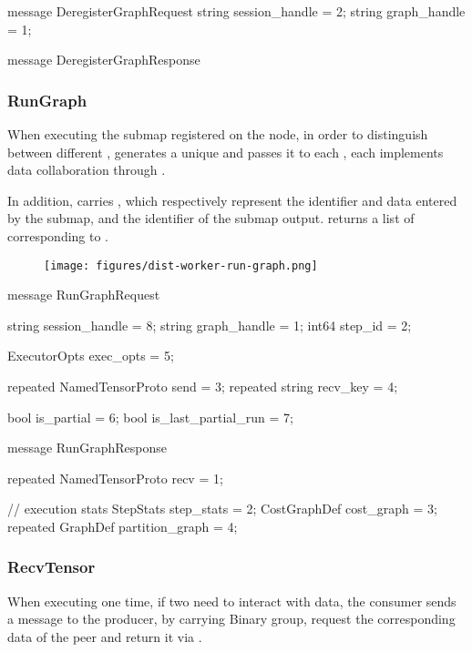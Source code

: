 \begin{content}
\begin{leftbar}
\begin{c++}
message DeregisterGraphRequest {
  string session_handle = 2;
  string graph_handle = 1;
}

message DeregisterGraphResponse {
}
\end{c++}
\end{leftbar}


\subsubsection{RunGraph}
When executing the submap registered on the  node, in order to distinguish between different ,  generates a unique  and passes it to each , each  implements data collaboration through .

In addition,  carries , which respectively represent the  identifier and data entered by the submap, and the  identifier of the submap output.  returns a list of  corresponding to .

\begin{figure}[H]
  \centering
  \texttt{[image: figures/dist-worker-run-graph.png]}
  \caption{}
  \label{fig:dist-worker-run-graph}
\end{figure}

\begin{leftbar}
\begin{c++}
message RunGraphRequest {
  string session_handle = 8;
  string graph_handle = 1;
  int64 step_id = 2;

  ExecutorOpts exec_opts = 5;

  repeated NamedTensorProto send = 3;
  repeated string recv_key = 4;

  bool is_partial = 6;
  bool is_last_partial_run = 7;
}

message RunGraphResponse {
  repeated NamedTensorProto recv = 1;

  // execution stats
  StepStats step_stats = 2;
  CostGraphDef cost_graph = 3;
  repeated GraphDef partition_graph = 4;
}
\end{c++}
\end{leftbar}


\subsubsection{RecvTensor}
When executing  one time, if two  need to interact with data, the consumer sends a  message to the producer, by carrying  Binary group, request the corresponding  data of the peer  and return it via .


\end{content}
